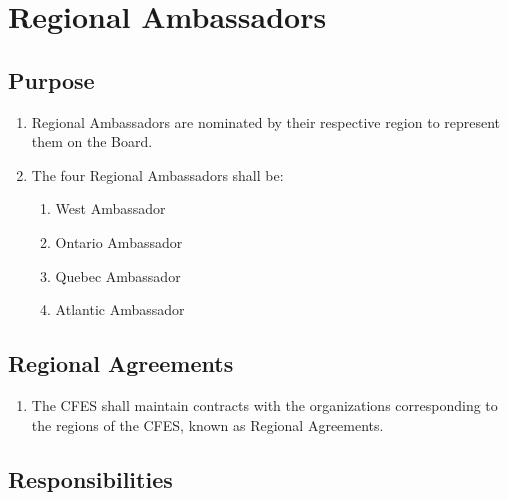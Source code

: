 \section{Regional Ambassadors}
\label{regional-ambassadors}

\subsection{Purpose}
\label{regional-ambassadors-purpose}

\begin{enumerate}
 \item Regional Ambassadors are nominated by their respective region to represent them on the Board.
 \item The four Regional Ambassadors shall be:
  \begin{enumerate}
   \item West Ambassador
   \item Ontario Ambassador
   \item Quebec Ambassador
   \item Atlantic Ambassador
  \end{enumerate}
\end{enumerate}

\subsection{Regional Agreements}
\label{regional-ambassadors-regional-agreements}

\begin{enumerate}
 \item The CFES shall maintain contracts with the organizations corresponding to the regions of the CFES, known as Regional Agreements.
\end{enumerate}

\subsection{Responsibilities}
\label{regional-ambassadors-responsibilities}

